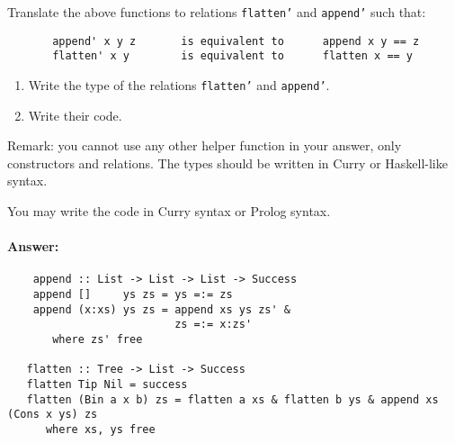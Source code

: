 \documentclass{article}
\newcommand{\answer}{\paragraph{Answer:}}
\begin{document}
Translate the above functions to relations \texttt{flatten'} and
\texttt{append'} such that:
\begin{verbatim}
       append' x y z       is equivalent to      append x y == z
       flatten' x y        is equivalent to      flatten x == y
\end{verbatim}

\begin{enumerate}
\item Write the type of the relations \texttt{flatten'} and
  \texttt{append'}. 
\item Write their code. 
\end{enumerate}

Remark: you cannot use any other helper function in your answer, only
constructors and relations. The types should be written in Curry or
Haskell-like syntax.

You may write the code in Curry syntax or Prolog syntax. 
\answer
\begin{verbatim}
    append :: List -> List -> List -> Success
    append []     ys zs = ys =:= zs
    append (x:xs) ys zs = append xs ys zs' &
                          zs =:= x:zs'
       where zs' free

   flatten :: Tree -> List -> Success
   flatten Tip Nil = success
   flatten (Bin a x b) zs = flatten a xs & flatten b ys & append xs (Cons x ys) zs
      where xs, ys free
  \end{verbatim}
\end{document}
